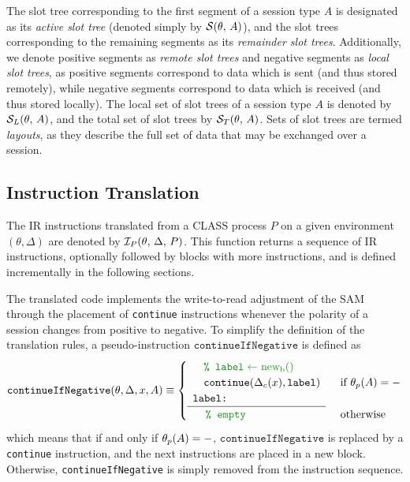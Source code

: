 The slot tree corresponding to the first segment of a session type $A$ is designated as its \textit{active slot tree}  (denoted simply by $\mathcal{S}(\theta,\,A)$), and the slot trees corresponding to the remaining segments as its \textit{remainder slot trees}. Additionally, we denote positive segments as \textit{remote slot trees} and negative segments as \textit{local slot trees}, as positive segments correspond to data which is sent (and thus stored remotely), while negative segments correspond to data which is received (and thus stored locally). The local set of slot trees of a session type $A$ is denoted by $\mathcal{S}_L(\theta,\,A)$, and the total set of slot trees by $\mathcal{S}_T(\theta,\,A)$. Sets of slot trees are termed \textit{layouts}, as they describe the full set of data that may be exchanged over a session.

\subsection{Instruction Translation}

The \ac{IR} instructions translated from a \ac{CLASS} process $P$ on a given environment $(\theta, \Delta)$ are denoted by $\mathcal{I}_P(\theta,\,\Delta,\,P)$. This function returns a sequence of \ac{IR} instructions, optionally followed by blocks with more instructions, and is defined incrementally in the following sections.

The translated code implements the write-to-read adjustment of the \ac{SAM} through the placement of \texttt{continue} instructions whenever the polarity of a session changes from positive to negative. To simplify the definition of the translation rules, a pseudo-instruction $\texttt{continueIfNegative}$ is defined as
\[
\texttt{continueIfNegative}(\theta, \Delta, x, A) \equiv \begin{cases}
    \begin{array}{l}
        \quad\textcolor{forestgreen}{\texttt{\% }\makeblock{\texttt{label}}} \\
        \quad\texttt{continue}(\continuationof{\Delta}{x}, \texttt{label}) \\
        \texttt{label:} \\
        \hline
    \end{array} & \text{ if } \polarityof{\theta}{A} = -\\
    \quad\ \ \textcolor{forestgreen}{\texttt{\%\ empty}} & \text{ otherwise}\\
\end{cases}
\]
which means that if and only if $\theta_{p}(A) = -$, $\texttt{continueIfNegative}$ is replaced by a \texttt{continue} instruction, and the next instructions are placed in a new block. Otherwise, \texttt{continueIfNegative} is simply removed from the instruction sequence.

